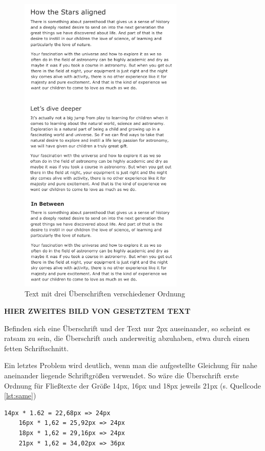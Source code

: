 \begin{figure}[h]
    \centering
    \includegraphics[width=0.7\textwidth]{images/three-headlines.png}
    \caption{Text mit drei Überschriften verschiedener Ordnung}
    \label{fig:threeHeadlines}
\end{figure}


\textbf{HIER ZWEITES BILD VON GESETZTEM TEXT}

Befinden sich eine Überschrift und der Text nur 2px auseinander, so scheint es ratsam zu sein, die Überschrift auch anderweitig abzuhaben, etwa durch einen fetten Schriftschnitt.

Ein letztes Problem wird deutlich, wenn man die aufgestellte Gleichung für nahe aneinander liegende Schriftgrößen verwendet. So wäre die Überschrift erste Ordnung für Fließtexte der Größe 14px, 16px und 18px jeweils 21px (s. Quellcode \ref{lst:same})


\begin{lstlisting}[caption={Berechnung mit verschiedenen Textgrößen},label={lst:same}]
	14px * 1.62 = 22,68px => 24px
	16px * 1,62 = 25,92px => 24px
	18px * 1,62 = 29,16px => 24px
	21px * 1,62 = 34,02px => 36px
\end{lstlisting}


